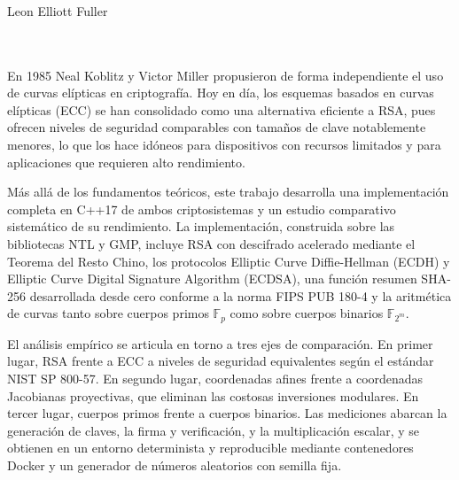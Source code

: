 \chapter*{}






\cleardoublepage
\thispagestyle{empty}

\begin{center}
{\large\bfseries \myTitle}\\
\end{center}
\begin{center}
Leon Elliott Fuller\\
\end{center}

\\

\vspace{0.7cm}
\\
En 1985 Neal Koblitz y Victor Miller propusieron de forma independiente el uso de curvas elípticas en criptografía. Hoy en día, los esquemas basados en curvas elípticas (ECC) se han consolidado como una alternativa eficiente a RSA, pues ofrecen niveles de seguridad comparables con tamaños de clave notablemente menores, lo que los hace idóneos para dispositivos con recursos limitados y para aplicaciones que requieren alto rendimiento.

Más allá de los fundamentos teóricos, este trabajo desarrolla una implementación completa en C++17 de ambos criptosistemas y un estudio comparativo sistemático de su rendimiento. La implementación, construida sobre las bibliotecas NTL y GMP, incluye RSA con descifrado acelerado mediante el Teorema del Resto Chino, los protocolos Elliptic Curve Diffie-Hellman (ECDH) y Elliptic Curve Digital Signature Algorithm (ECDSA), una función resumen SHA-256 desarrollada desde cero conforme a la norma FIPS PUB 180-4 y la aritmética de curvas tanto sobre cuerpos primos $\mathbb{F}_p$ como sobre cuerpos binarios $\mathbb{F}_{2^m}$.

El análisis empírico se articula en torno a tres ejes de comparación. En primer lugar, RSA frente a ECC a niveles de seguridad equivalentes según el estándar NIST SP 800-57. En segundo lugar, coordenadas afines frente a coordenadas Jacobianas proyectivas, que eliminan las costosas inversiones modulares. En tercer lugar, cuerpos primos frente a cuerpos binarios. Las mediciones abarcan la generación de claves, la firma y verificación, y la multiplicación escalar, y se obtienen en un entorno determinista y reproducible mediante contenedores Docker y un generador de números aleatorios con semilla fija.

